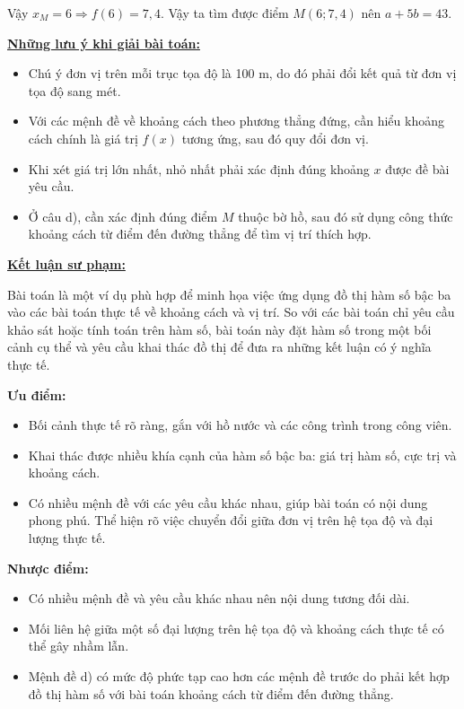 \documentclass[12pt,a4paper,oneside]{book}
\theoremstyle{theorem}
\theoremstyle{definition}
\begin{document}
Vậy $x_M = 6 \Rightarrow f(6) = 7,4$. Vậy ta tìm được điểm $M(6; 7,4)$ nên $a + 5b = 43$.

        \textbf{\underline{Những lưu ý khi giải bài toán:}}
        \begin{itemize}
            \item Chú ý đơn vị trên mỗi trục tọa độ là 100 m, do đó phải đổi kết quả từ đơn vị tọa độ sang mét.
            \item Với các mệnh đề về khoảng cách theo phương thẳng đứng, cần hiểu khoảng cách chính là giá trị \(f(x)\) tương ứng, sau đó quy đổi đơn vị.
            \item Khi xét giá trị lớn nhất, nhỏ nhất phải xác định đúng khoảng \(x\) được đề bài yêu cầu.
            \item Ở câu d), cần xác định đúng điểm \(M\) thuộc bờ hồ, sau đó sử dụng công thức khoảng cách từ điểm đến đường thẳng để tìm vị trí thích hợp.
        \end{itemize}
        
        \textbf{\underline{Kết luận sư phạm:}}

        Bài toán là một ví dụ phù hợp để minh họa việc ứng dụng đồ thị hàm số bậc ba vào các bài toán thực tế về khoảng cách và vị trí. So với các bài toán chỉ yêu cầu khảo sát hoặc tính toán trên hàm số, bài toán này đặt hàm số trong một bối cảnh cụ thể và yêu cầu khai thác đồ thị để đưa ra những kết luận có ý nghĩa thực tế.
        
        \textbf{Ưu điểm:}
        \begin{itemize}
            \item Bối cảnh thực tế rõ ràng, gắn với hồ nước và các công trình trong công viên.
            \item Khai thác được nhiều khía cạnh của hàm số bậc ba: giá trị hàm số, cực trị và khoảng cách.
            \item Có nhiều mệnh đề với các yêu cầu khác nhau, giúp bài toán có nội dung phong phú.
Thể hiện rõ việc chuyển đổi giữa đơn vị trên hệ tọa độ và đại lượng thực tế.
        \end{itemize}
        
        \textbf{Nhược điểm:}
        \begin{itemize}
            \item Có nhiều mệnh đề và yêu cầu khác nhau nên nội dung tương đối dài.
            \item Mối liên hệ giữa một số đại lượng trên hệ tọa độ và khoảng cách thực tế có thể gây nhầm lẫn.
            \item Mệnh đề d) có mức độ phức tạp cao hơn các mệnh đề trước do phải kết hợp đồ thị hàm số với bài toán khoảng cách từ điểm đến đường thẳng.
        \end{itemize}
\end{document}

